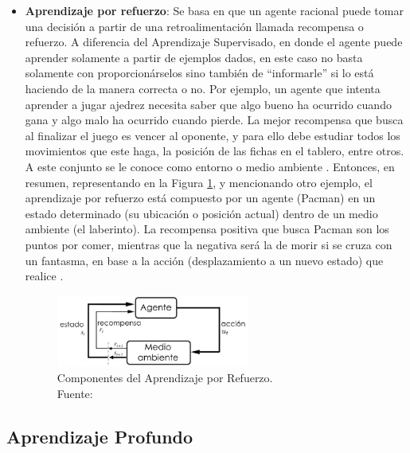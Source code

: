 \begin{itemize}
	\item \textbf{Aprendizaje por refuerzo}: Se basa en que un agente racional puede tomar una decisión a partir de una retroalimentación llamada recompensa o refuerzo. A diferencia del Aprendizaje Supervisado, en donde el agente puede aprender solamente a partir de ejemplos dados, en este caso no basta solamente con proporcionárselos sino también de “informarle” si lo está haciendo de la manera correcta o no. Por ejemplo, un agente que intenta aprender a jugar ajedrez necesita saber que algo bueno ha ocurrido cuando gana y algo malo ha ocurrido cuando pierde. La mejor recompensa que busca al finalizar el juego es vencer al oponente, y para ello debe estudiar todos los movimientos que este haga, la posición de las fichas en el tablero, entre otros. A este conjunto se le conoce como entorno o medio ambiente \parencite{bk_russell2004intart}. Entonces, en resumen, representando en la Figura \ref{2:fig4}, y mencionando otro ejemplo, el aprendizaje por refuerzo está compuesto por un agente (Pacman) en un estado determinado (su ubicación o posición actual) dentro de un medio ambiente (el laberinto). La recompensa positiva que busca Pacman son los puntos por comer, mientras que la negativa será la de morir si se cruza con un fantasma, en base a la acción (desplazamiento a un nuevo estado) que realice \parencite{tec_merino2019aprendrefuerzo}.
	\begin{figure}[h]
		\begin{center}
			\includegraphics[width=0.60\textwidth]{2/figures/aprendizaje_refuerzo.jpg}
			\caption[Componentes del Aprendizaje por Refuerzo]{Componentes del Aprendizaje por Refuerzo.\\
			Fuente: \cite{bk_sutton2018rl}}
			\label{2:fig4}
		\end{center}
	\end{figure}
\end{itemize}

\clearpage

\subsection{Aprendizaje Profundo}

